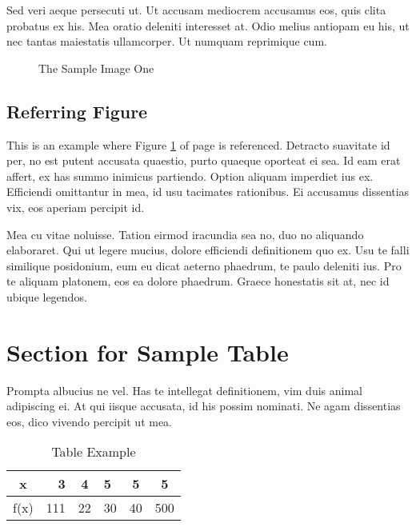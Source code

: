 Sed veri aeque persecuti ut. Ut accusam mediocrem accusamus eos, quis clita probatus ex his. Mea oratio deleniti interesset at. Odio melius antiopam eu his, ut nec tantas maiestatis ullamcorper. Ut numquam reprimique cum.

\begin{figure}[tbh] %
\begin{center}
	\caption{The Sample Image One} %
	\label{figSample1} %
\end{center}
\end{figure}

\subsection{Referring Figure}
This is an example where Figure \ref{figSample1} of page \pageref{figSample1} is referenced. Detracto suavitate id per, no est putent accusata quaestio, purto quaeque oporteat ei sea. Id eam erat affert, ex has summo inimicus partiendo. Option aliquam imperdiet ius ex. Efficiendi omittantur in mea, id usu tacimates rationibus. Ei accusamus dissentias vix, eos aperiam percipit id.

Mea cu vitae noluisse. Tation eirmod iracundia sea no, duo no aliquando elaboraret. Qui ut legere mucius, dolore efficiendi definitionem quo ex. Usu te falli similique posidonium, eum eu dicat aeterno phaedrum, te paulo deleniti ius. Pro te aliquam platonem, eos ea dolore phaedrum. Graece honestatis sit at, nec id ubique legendos.

\section{Section for Sample Table}
Prompta albucius ne vel. Has te intellegat definitionem, vim duis animal adipiscing ei. At qui iisque accusata, id his possim nominati. Ne agam dissentias eos, dico vivendo percipit ut mea.

\begin{table}[tbh]
\centering
\caption{Table Example}
\begin{tabular}{|c|r|c|l|c|c|} %
	\hline %
	x &3 &4 &5 &5 &5\\
	\hline %
	f(x) &111 &22 &30 &40 &500\\
	\hline %
\end{tabular}
\label{tblSampleTable}
\end{table}

